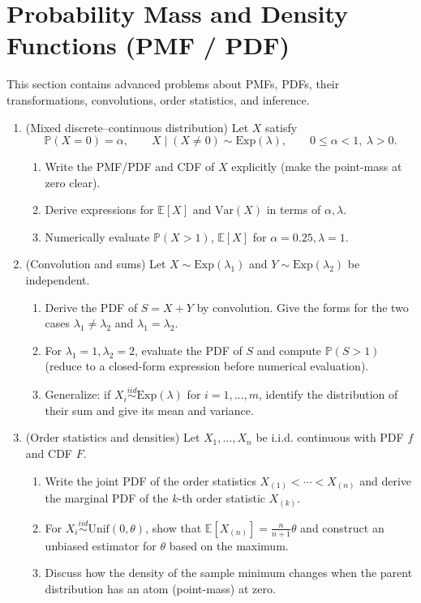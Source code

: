 \documentclass[12pt,a4paper]{article}
\begin{document}
\section{Probability Mass and Density Functions (PMF / PDF)}
This section contains advanced problems about PMFs, PDFs, their transformations, convolutions, order statistics, and inference.
\begin{enumerate}[label=(\arabic*)]
\item (Mixed discrete–continuous distribution) Let \(X\) satisfy
    \[ \mathbb{P}(X=0)=\alpha, \qquad X\mid(X\neq0) \sim \mathrm{Exp}(\lambda), \qquad 0\le\alpha<1,\ \lambda>0. \]
    \begin{enumerate}[label=(\alph*)]
    \item Write the PMF/PDF and CDF of \(X\) explicitly (make the point-mass at zero clear).
    \item Derive expressions for \(\mathbb{E}[X]\) and \(\mathrm{Var}(X)\) in terms of \(\alpha,\lambda\).
    \item Numerically evaluate \(\mathbb{P}(X>1)\), \(\mathbb{E}[X]\) for \(\alpha=0.25,\lambda=1\).
    \end{enumerate}

\item (Convolution and sums) Let \(X\sim\mathrm{Exp}(\lambda_1)\) and \(Y\sim\mathrm{Exp}(\lambda_2)\) be independent.
    \begin{enumerate}[label=(\alph*)]
    \item Derive the PDF of \(S=X+Y\) by convolution. Give the forms for the two cases \(\lambda_1\neq\lambda_2\) and \(\lambda_1=\lambda_2\).
    \item For \(\lambda_1=1,\lambda_2=2\), evaluate the PDF of \(S\) and compute \(\mathbb{P}(S>1)\) (reduce to a closed-form expression before numerical evaluation).
    \item Generalize: if \(X_i\stackrel{iid}{\sim}\mathrm{Exp}(\lambda)\) for \(i=1,\dots,m\), identify the distribution of their sum and give its mean and variance.
    \end{enumerate}

\item (Order statistics and densities) Let \(X_1,\dots,X_n\) be i.i.d. continuous with PDF \(f\) and CDF \(F\).
    \begin{enumerate}[label=(\alph*)]
    \item Write the joint PDF of the order statistics \(X_{(1)}<\cdots<X_{(n)}\) and derive the marginal PDF of the \(k\)-th order statistic \(X_{(k)}\).
    \item For \(X_i\stackrel{iid}{\sim}\mathrm{Unif}(0,\theta)\), show that \(\mathbb{E}[X_{(n)}]=\frac{n}{n+1}\theta\) and construct an unbiased estimator for \(\theta\) based on the maximum.
    \item Discuss how the density of the sample minimum changes when the parent distribution has an atom (point-mass) at zero.
    \end{enumerate}


\end{enumerate}
\end{document}
